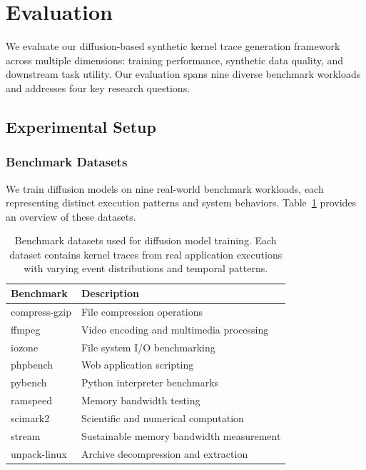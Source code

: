 \section{Evaluation}
\label{sec:evaluation}

We evaluate our diffusion-based synthetic kernel trace generation framework across multiple dimensions: training performance, synthetic data quality, and downstream task utility. Our evaluation spans nine diverse benchmark workloads and addresses four key research questions.

\subsection{Experimental Setup}
\label{subsec:setup}

\subsubsection{Benchmark Datasets}
We train diffusion models on nine real-world benchmark workloads, each representing distinct execution patterns and system behaviors. Table~\ref{tab:benchmarks} provides an overview of these datasets.

\begin{table}[h]
\centering
\caption{Benchmark datasets used for diffusion model training. Each dataset contains kernel traces from real application executions with varying event distributions and temporal patterns.}
\label{tab:benchmarks}
\begin{tabular}{@{}lp{5cm}@{}}
\toprule
\textbf{Benchmark} & \textbf{Description} \\
\midrule
compress-gzip & File compression operations \\
ffmpeg & Video encoding and multimedia processing \\
iozone & File system I/O benchmarking \\
phpbench & Web application scripting \\
pybench & Python interpreter benchmarks \\
ramspeed & Memory bandwidth testing \\
scimark2 & Scientific and numerical computation \\
stream & Sustainable memory bandwidth measurement \\
unpack-linux & Archive decompression and extraction \\
\bottomrule
\end{tabular}
\end{table}

